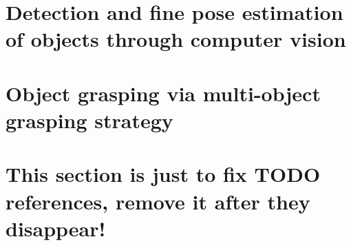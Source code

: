 \usepackage{amsmath}
\usepackage{adjustbox}
\usepackage[
backend=biber,
style=numeric, %
]{biblatex}









\newcommand{\vmiddle}[1]{\begin{tabular}{@{}c@{}} {#1} \end{tabular}}

\english
\tableofcontents
\listoffigures
\listoftables
\chapter{Detection and fine pose estimation of objects through computer vision}
\label{sec:vision}






\chapter{Object grasping via multi-object grasping strategy}





\chapter{This section is just to fix TODO references, remove it after they
disappear!} \label{sec:TODO}
\printbibliography

